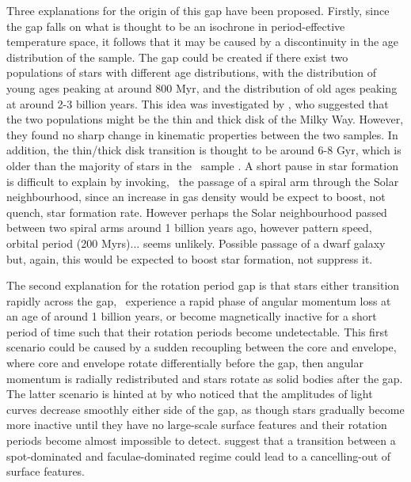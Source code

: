 Three explanations for the origin of this gap have been proposed.
Firstly, since the gap falls on what is thought to be an isochrone in
period-effective temperature space, it follows that it may be caused by a
discontinuity in the age distribution of the sample.
The gap could be created if there exist two populations of stars with
different age distributions, with the distribution of young ages peaking at
around 800 Myr, and the distribution of old ages peaking at around 2-3 billion
years.
This idea was investigated by \mct, who suggested that the two populations
might be the thin and thick disk of the Milky Way.
However, they found no sharp change in kinematic properties between the two
samples.
In addition, the thin/thick disk transition is thought to be around 6-8 Gyr,
which is older than the majority of stars in the \mct\ sample
.
A short pause in star formation is difficult to explain by invoking, \eg\ the
passage of a spiral arm through the Solar neighbourhood, since an increase in
gas density would be expect to boost, not quench, star formation rate.
However perhaps the Solar neighbourhood passed between two spiral arms around
1 billion years ago, however pattern speed, orbital period (200 Myrs)... seems
unlikely.
Possible passage of a dwarf galaxy but, again, this would be expected to boost
star formation, not suppress it.

The second explanation for the rotation period gap is that stars either
transition rapidly across the gap, \ie\ experience a rapid phase of angular
momentum loss at an age of around 1 billion years, or become magnetically
inactive for a short period of time such that their rotation periods become
undetectable.
This first scenario could be caused by a sudden recoupling between the core
and envelope, where core and envelope rotate differentially before the gap,
then angular momentum is radially redistributed and stars rotate as solid
bodies after the gap.
The latter scenario is hinted at by \citet{reinhold2017} who noticed that the
amplitudes of light curves decrease smoothly either side of the gap, as though
stars gradually become more inactive until they have no large-scale surface
features and their rotation periods become almost impossible to detect.
\citet{reinhold2017} suggest that a transition between a spot-dominated and
faculae-dominated regime could lead to a cancelling-out of surface features.

